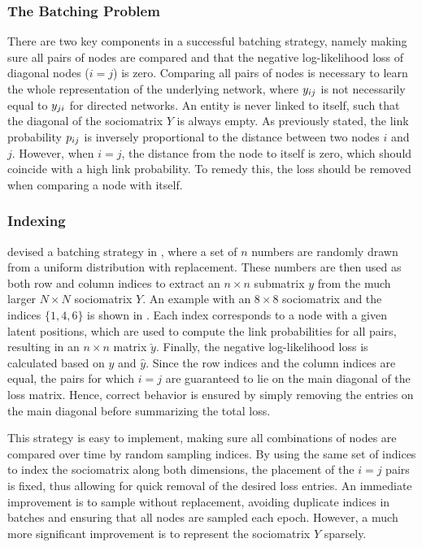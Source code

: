     \subsubsection{The Batching Problem}
    
        There are two key components in a successful batching strategy, namely making sure all pairs of nodes are compared and that the negative log-likelihood loss of diagonal nodes ($i=j$) is zero. 
        Comparing all pairs of nodes is necessary to learn the whole representation of the underlying network, where $\sub(y)$ is not necessarily equal to $\sub(y)(ji)$ for directed networks. 
        An entity is never linked to itself, such that the diagonal of the sociomatrix $Y$ is always empty. As previously stated, the link probability $\sub(p)$ is inversely proportional to the distance between two nodes $i$ and $j$. However, when $i=j$, the distance from the node to itself is zero, which should coincide with a high link probability. To remedy this, the loss should be removed when comparing a node with itself.
        
    \subsubsection{Indexing}
    
        \citeauthor{jacobsen2018a} devised a batching strategy in \cite{jacobsen2018a}, where a set of $n$ numbers are randomly drawn from a uniform distribution with replacement. These numbers are then used as both row and column indices to extract an $n\times n$ submatrix $y$ from the much larger $N\times N$ sociomatrix $Y$. An example with an $8\times 8$ sociomatrix and the indices $\{1,4,6\}$ is shown in . Each index corresponds to a node with a given latent positions, which are used to compute the link probabilities for all pairs, resulting in an $n\times n$ matrix $\hat{y}$. Finally, the negative log-likelihood loss is calculated based on $y$ and $\hat{y}$. Since the row indices and the column indices are equal, the pairs for which $i=j$ are guaranteed to lie on the main diagonal of the loss matrix. Hence, correct behavior is ensured by simply removing the entries on the main diagonal before summarizing the total loss. 
    
        
        This strategy is easy to implement, making sure all combinations of nodes are compared over time by random sampling indices. By using the same set of indices to index the sociomatrix along both dimensions, the placement of the $i=j$ pairs is fixed, thus allowing for quick removal of the desired loss entries.
        An immediate improvement is to sample without replacement, avoiding duplicate indices in batches and ensuring that all nodes are sampled each epoch. However, a much more significant improvement is to represent the sociomatrix $Y$ sparsely.
        
